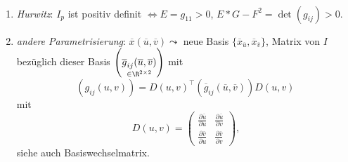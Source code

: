 \begin{remark}
  \
  \begin{enumerate}
    \item \emph{Hurwitz}: $ I_p $ ist positiv definit $ \Leftrightarrow E = g_{11} > 0 $, $ E*G-F^2 = \det(g_{ij}) > 0 $.
    \item \emph{andere Parametrisierung}: $ \overline{x}(\overline{u},\overline{v}) \leadsto $ neue Basis $ \{ \overline{x}_{\overline{u}}, \overline{x}_{\overline{v}} \} $, Matrix von $ I $ bezüglich dieser Basis $ \left( \underset{\in \R^{2\times 2}}{\overline{g}_{ij}(\overline{u}, \overline{v})} \right) $ mit
    \begin{equation*}
      \left( g_{ij}(u,v) \right) = D(u,v)^\top(\overline{g}_{ij}(\overline{u},\overline{v}))D(u,v)
    \end{equation*}
    mit 
    \begin{equation*}
      D(u,v) = \begin{pmatrix}
        \frac{\partial \overline{u}}{\partial u} & \frac{\partial \overline{u}}{\partial v} \\
        \frac{\partial \overline{v}}{\partial u} & \frac{\partial \overline{v}}{\partial v}
      \end{pmatrix}\text{,}
    \end{equation*}
    siehe auch Basiswechselmatrix.
  \end{enumerate}
\end{remark}

